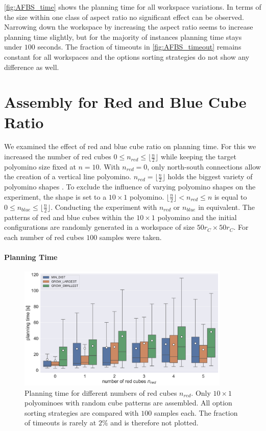 \autoref{fig:AFBS_time} shows the planning time for all workspace variations.
In terms of the size within one class of aspect ratio no significant effect can be observed.
Narrowing down the workspace by increasing the aspect ratio seems to increase planning time slightly, but for the majority of instances planning time stays under $100$ seconds.
The fraction of timeouts in \autoref{fig:AFBS_timeout} remains constant for all workspaces and the options sorting strategies do not show any difference as well.



\section{Assembly for Red and Blue Cube Ratio}
\label{sec:AFNR}

We examined the effect of red and blue cube ratio on planning time.
For this we increased the number of red cubes $0 \leq n_\textit{red} \leq \lfloor \frac{n}{2}\rfloor$ while keeping the target polyomino size fixed at $n = 10$.
With $n_\textit{red} = 0$, only north-south connections allow the creation of a vertical line polyomino.
$n_\textit{red} = \lfloor \frac{n}{2}\rfloor$ holds the biggest variety of polyomino shapes \cite{Lu2021}.
To exclude the influence of varying polyomino shapes on the experiment, the shape is set to a $10 \times 1$ polyomino.
$\lfloor \frac{n}{2}\rfloor < n_\textit{red} \leq n$ is equal to $0 \leq n_\textit{blue} \leq \lfloor \frac{n}{2}\rfloor$.
Conducting the experiment with $n_\textit{red}$ or $n_\textit{blue}$ in equivalent.
The patterns of red and blue cubes within the $10 \times 1$ polyomino and the initial configurations are randomly generated in a workspace of size $50 r_C \times 50 r_C$.
For each number of red cubes $100$ samples were taken.

\paragraph{Planning Time}

\begin{figure}
	\centering
	\includegraphics[width=0.9\textwidth]{figures/plots/AFNR_time.pdf}
	\caption[Planning time for number of red cubes]{Planning time for different numbers of red cubes $n_\textit{red}$. Only $10 \times 1$ polyominoes with random cube patterns are assembled. All option sorting strategies are compared with $100$ samples each. The fraction of timeouts is rarely at $2\%$ and is therefore not plotted.}
	\label{fig:AFNR_time}
\end{figure}

